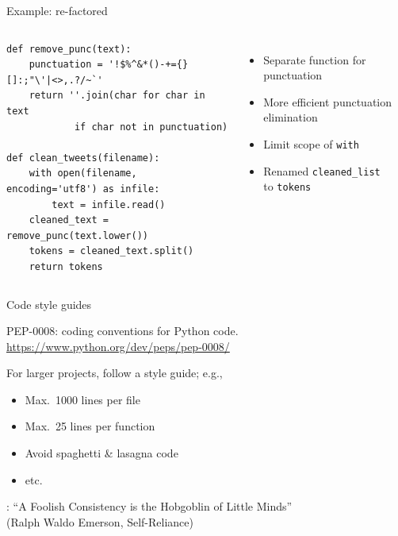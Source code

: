 \documentclass[aspectratio=169,usenames,dvipsnames]{beamer}
\begin{document}
\begin{frame}[fragile]{Example: re-factored}
\begin{columns}
\begin{lstlisting}[style=smaller]
def remove_punc(text):
    punctuation = '!$%^&*()-+={}[]:;"\'|<>,.?/~`'
    return ''.join(char for char in text
            if char not in punctuation)

def clean_tweets(filename):
    with open(filename, encoding='utf8') as infile:
        text = infile.read()
    cleaned_text = remove_punc(text.lower())
    tokens = cleaned_text.split()
    return tokens
\end{lstlisting}
\begin{itemize}
\item Separate function for punctuation
\item More efficient punctuation elimination
\item Limit scope of \lstinline{with}
\item Renamed \lstinline{cleaned_list} \\
    to \lstinline{tokens}
\end{itemize}
\end{columns}
\end{frame}

\begin{frame}{Code style guides}
    \begin{reference}
        PEP-0008: coding conventions for Python code.
        \url{https://www.python.org/dev/peps/pep-0008/}
    \end{reference}

    For larger projects, follow a style guide; e.g.,
    \begin{itemize}
        \item Max.\ 1000 lines per file
        \item Max.\ 25 lines per function
        \item Avoid spaghetti \& lasagna code
        \item etc.
    \end{itemize}
   
    \vspace{1em}
    :
        ``A Foolish Consistency is the Hobgoblin of Little Minds'' \\
        (Ralph Waldo Emerson, Self-Reliance)
\end{frame}
\end{document}

